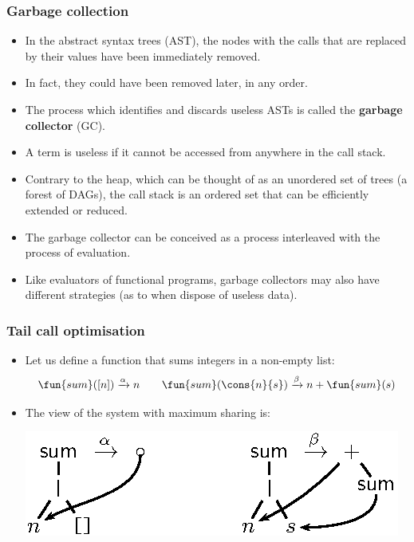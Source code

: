 \documentclass[compress,dvips,xcolor={dvipsnames},t]{beamer}
\begin{document}
\begin{frame}
  \frametitle{Garbage collection}

  \begin{itemize}

    \item In the abstract syntax trees (AST), the nodes with the calls
      that are replaced by their values have been immediately removed.

    \item In fact, they could have been removed later, in any order.

    \item The process which identifies and discards useless ASTs is
      called the \textbf{garbage collector} (GC).

    \item A term is useless if it cannot be accessed from anywhere in
      the call stack.

    \item Contrary to the heap, which can be thought of as an
      unordered set of trees (a forest of DAGs), the call stack is an
      ordered set that can be efficiently extended or reduced.

    \item The garbage collector can be conceived as a process
      interleaved with the process of evaluation.

    \item Like evaluators of functional programs, garbage collectors
      may also have different strategies (as to when dispose of
      useless data).
  \end{itemize}

\end{frame}

\begin{frame}
  \frametitle{Tail call optimisation}

  \begin{itemize}

    \item Let us define a function that sums integers in a
      non\hyp{}empty list:
      \begin{equation*}
        \fun{sum}([n]) \xrightarrow{\alpha} n\qquad
        \fun{sum}(\cons{n}{s}) \xrightarrow{\beta} n + \fun{sum}(s)
      \end{equation*}

    \item The view of the system with maximum sharing is:
      \begin{center}
        \includegraphics{sum_dag}
      \end{center}

  \end{itemize}

\end{frame}
\end{document}
